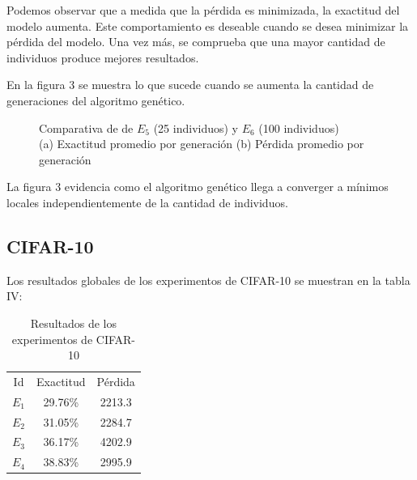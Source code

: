 \documentclass[conference]{IEEEtran}
\begin{document}
Podemos observar que a medida que la pérdida es minimizada, la exactitud del modelo aumenta. Este comportamiento es deseable cuando se desea minimizar la pérdida del modelo. Una vez más, se comprueba que una mayor cantidad de individuos produce mejores resultados.

En la figura 3 se muestra lo que sucede cuando se aumenta la cantidad de generaciones del algoritmo genético.

\begin{figure}[h]
\begin{centering}
\begin{subfigure}{.25\textwidth}
   \begin{centering}
	\scalebox{0.35}{}
	\end{centering}
    \caption{}
    \label{}\end{subfigure}%
\begin{subfigure}{.25\textwidth}
  \begin{centering}
	\scalebox{0.35}{}
	\end{centering}
    \caption{}
    \label{}
\end{subfigure}
\end{centering}
\caption{Comparativa de  de $E_5$ (25 individuos) y $E_6$ (100 individuos)\\(a) Exactitud promedio por generación (b) Pérdida promedio por generación}
\label{figure:comparision_fitness}
\end{figure}

La figura 3 evidencia como el algoritmo genético llega a converger a mínimos locales independientemente de la cantidad de individuos.

\subsection{CIFAR-10}
Los resultados globales de los experimentos de CIFAR-10 se muestran en la tabla IV:

\begin{table}[h]
\centering
\caption{Resultados de los experimentos de CIFAR-10}
\label{my-label}
\begin{tabular}{ccc}
Id    & Exactitud & Pérdida \\
$E_1$ & 29.76\%   & 2213.3  \\
$E_2$ & 31.05\%   & 2284.7  \\
$E_3$ & 36.17\%   & 4202.9  \\
$E_4$ & 38.83\%   & 2995.9 
\end{tabular}
\end{table}
\end{document}
